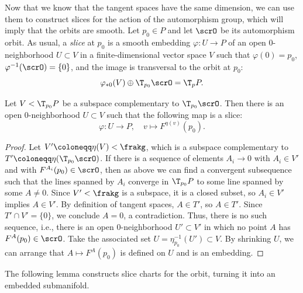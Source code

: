 Now that we know that the tangent spaces have the same dimension, we can use them to construct slices for the action of the automorphism group, which will imply that the orbits are smooth. Let $p_0\in P$ and let $\scrO$ be its automorphism orbit. As usual, a \emph{slice} at $p_0$ is a smooth embedding $\varphi:U\to P$ of an open $0$-neighborhood $U\subset V$ in a finite-dimensional vector space $V$ such that $\varphi(0)=p_0$, $\varphi^{-1}(\scrO)=\{0\}$, and the image is transversal to the orbit at $p_0$: 
\[\varphi_{\ast 0}(V)\oplus\T_{p_0}\scrO=\T_p P.\]

\begin{lem}\label{lem 12.22 McKay}
    Let $V<\T_{p_0}P$ be a subspace complementary to $\T_{p_0}\scrO$. Then there is an open $0$-neighborhood $U\subset V$ such that the following map is a slice:
    \[\varphi:U\to P,\quad  v\mapsto F^{\eta(v)}(p_0).\]
\end{lem}
\begin{proof}
    Let $V'\coloneqq \eta(V)<\frakg$, which is a subspace complementary to $T'\coloneqq \eta(\T_{p_0}\scrO)$. If there is a sequence of elements $A_i\to 0$ with $A_i\in V'$ and with $F^{A_i}(p_0)\in \scrO$, then as above we can find a convergent subsequence such that the lines spanned by $A_i$ converge in $\T_{p_0}P$ to some line spanned by some $A\neq 0$. Since $V'<\frakg$ is a subspace, it is a closed subset, so $A_i\in V'$ implies $A\in V'$. By definition of tangent spaces, $A\in T'$, so $A\in T'$. Since $T'\cap V'=\{0\}$, we conclude $A=0$, a contradiction. Thus, there is no such sequence, i.e., there is an open $0$-neighborhood $U'\subset V'$ in which no point $A$ has $F^A(p_0)\in \scrO$. Take the associated set $U=\eta^{-1}_{p_0}(U')\subset V$. By shrinking $U$, we can arrange that $A\mapsto F^A(p_0)$ is defined on $U$ and is an embedding.
\end{proof}

The following lemma constructs slice charts for the orbit, turning it into an embedded submanifold.

